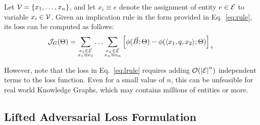 %
Let $\mathcal{V} = \{ x_{1}, \ldots, x_{n} \}$, and let $x_{i} \equiv e$ denote the assignment of entity $e \in \mathcal{E}$ to variable $x_{i} \in \mathcal{V}$.
%
Given an implication rule in the form provided in Eq.~\ref{eq:rule}, its loss can be computed as follows:
%
\begin{equation} \label{eq:lrule}
%
 \loss_{G}(\params) = \sum_{\substack{e_{1} \in \ents \\ x_{1} \equiv e_{1}}} \ldots \sum_{\substack{e_{n} \in \ents \\ x_{n} \equiv e_{n}}} \hinge{\fscore(\vec{B} ; \params) - \fscore(\trpl{x_{1}}{\relq}{x_{2}} ; \params)}
%
\end{equation}
%

However, note that the loss in Eq.~\ref{eq:lrule} requires adding $\mathcal{O}({|\mathcal{E}|}^{n})$ independent terms to the loss function.
%
Even for a small value of $n$, this can be unfeasible for real world Knowledge Graphs, which may contains millions of entities or more.
%

%
\subsection{Lifted Adversarial Loss Formulation}
%

